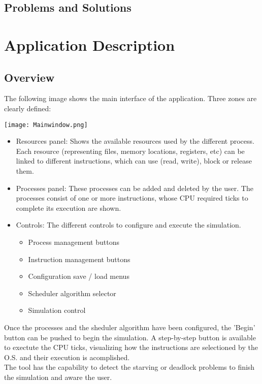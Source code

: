 \documentclass{report}
\begin{document}
    \section{Problems and Solutions}
\chapter{Application Description}
    \section{Overview}
        The following image shows the main interface of the application. Three zones are clearly defined:
        \begin{center}
            \texttt{[image: Mainwindow.png]}
        \end{center} 
        \begin{itemize}
            \item Resources panel: Shows the available resources used by the different process. Each resource (representing files, memory locations, registers, etc) can be linked to different instructions, which can use (read, write), block or release them.
            \item Processes panel: These processes can be added and deleted by the user. The processes consist of one or more instructions, whose CPU required ticks to complete its execution are shown.
            \item Controls: The different controls to configure and execute the simulation.
            \begin{itemize}
                \item Process management buttons
                \item Instruction management buttons
                \item Configuration save / load menus
                \item Scheduler algorithm selector
                \item Simulation control
            \end{itemize}
        \end{itemize}
        Once the processes and the sheduler algorithm have been configured, the 'Begin' button can be pushed to begin the simulation. A step-by-step button is available to exectute the CPU ticks, visualizing how the instructions are selectioned by the O.S. and their execution is acomplished.\\
        The tool has the capability to detect the starving or deadlock problems to finish the simulation and aware the user.
\end{document}
